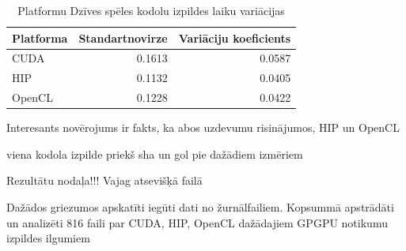 \begin{table}[H]
    \centering
    \begin{tabular}{lrr}
    \hline
    \textbf{Platforma} & \textbf{Standartnovirze} & \textbf{Variāciju koeficients}\\ \hline
    CUDA    & 0.1613 & 0.0587 \\
    HIP     & 0.1132 & 0.0405  \\
    OpenCL  & 0.1228 & 0.0422 \\
    \hline
    \end{tabular}
    \caption{Platformu Dzīves spēles kodolu izpildes laiku variācijas}
    \label{tab:kernel_exec_time_variations_gol} 
\end{table}


Interesants novērojums ir fakts, ka abos uzdevumu risinājumos, HIP un
OpenCL 


viena kodola izpilde priekš sha un gol pie dažādiem izmēriem





Rezultātu nodaļa!!! Vajag atsevišķā failā

Dažādos griezumos apskatīti iegūti dati no žurnālfailiem.
Kopsummā apstrādāti un analizēti 816 faili par CUDA, HIP, OpenCL
dažādajiem GPGPU notikumu izpildes ilgumiem
